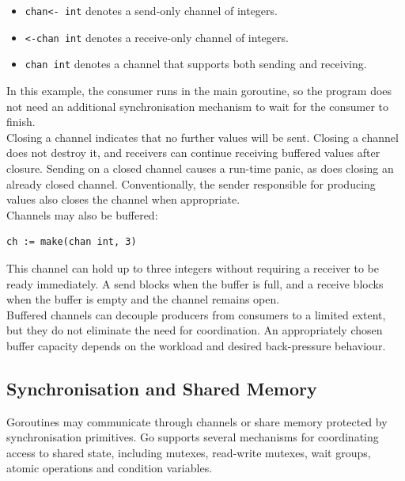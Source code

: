 \begin{itemize}
    \item \texttt{chan<- int} denotes a send-only channel of integers.
    \item \texttt{<-chan int} denotes a receive-only channel of integers.
    \item \texttt{chan int} denotes a channel that supports both sending and receiving.
\end{itemize}

In this example, the consumer runs in the main goroutine, so the program does not need an additional synchronisation mechanism to wait for the consumer to finish.\\

Closing a channel indicates that no further values will be sent. Closing a channel does not destroy it, and receivers can continue receiving buffered values after closure. Sending on a closed channel causes a run-time panic, as does closing an already closed channel. Conventionally, the sender responsible for producing values also closes the channel when appropriate.\\

Channels may also be buffered:

\begin{lstlisting}
ch := make(chan int, 3)
\end{lstlisting}

This channel can hold up to three integers without requiring a receiver to be ready immediately. A send blocks when the buffer is full, and a receive blocks when the buffer is empty and the channel remains open.\\

Buffered channels can decouple producers from consumers to a limited extent, but they do not eliminate the need for coordination. An appropriately chosen buffer capacity depends on the workload and desired back-pressure behaviour.\\

\subsection{Synchronisation and Shared Memory}

Goroutines may communicate through channels or share memory protected by synchronisation primitives. Go supports several mechanisms for coordinating access to shared state, including mutexes, read-write mutexes, wait groups, atomic operations and condition variables.\\

